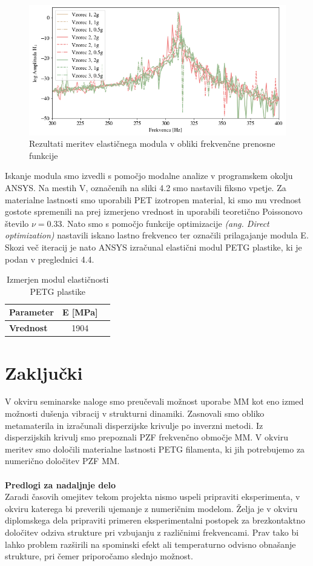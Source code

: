 \documentclass[12pt]{report}
\begin{document}
\begin{figure}[H]
  \centering
  \includegraphics[scale=0.6]{Images/frf.png}
  \caption{Rezultati meritev elastičnega modula v obliki frekvenčne prenosne funkcije}
\end{figure}
\noindent Iskanje modula smo izvedli s pomočjo modalne analize v programskem okolju ANSYS. Na mestih V, označenih na sliki 4.2 smo nastavili fiksno vpetje. Za materialne lastnosti smo uporabili PET izotropen material, ki smo mu
vrednost gostote spremenili na prej izmerjeno vrednost in uporabili teoretično Poissonovo število $\nu=0.33$. Nato smo s pomočjo funkcije optimizacije \emph{(ang. Direct optimization)} nastavili iskano lastno frekvenco ter označili prilagajanje modula E. Skozi več iteracij je nato
ANSYS izračunal elastični modul PETG plastike, ki je podan v preglednici 4.4.
\begin{table}[H]
  \caption{Izmerjen modul elastičnosti PETG plastike}
  \centering
  \begin{tabular}{ | l | c | r | }
    \hline
    \textbf{Parameter} & E [MPa] \\ \hline
    \textbf{Vrednost} & 1904 \\
    \hline  
  \end{tabular}
\end{table}

\chapter{Zaključki}
V okviru seminarske naloge smo preučevali možnost uporabe \ac{MM} kot eno izmed možnosti dušenja vibracij v strukturni dinamiki. 
Zasnovali smo obliko metamaterila in izračunali disperzijske krivulje po inverzni metodi. Iz disperzijskih krivulj smo prepoznali \ac{PZF} frekvenčno
območje \ac{MM}. V okviru meritev smo določili materialne lastnosti PETG filamenta, ki jih potrebujemo za numerično določitev \ac{PZF} \ac{MM}.
\\
\\
\textbf{Predlogi za nadaljnje delo}
\\
Zaradi časovih omejitev tekom projekta nismo uspeli pripraviti eksperimenta, v okviru katerega bi preverili ujemanje z numeričnim modelom. Želja je v okviru diplomskega dela 
pripraviti primeren eksperimentalni postopek za brezkontaktno določitev odziva strukture pri vzbujanju z različnimi frekvencami. Prav tako bi lahko problem razširili na spominski efekt ali temperaturno odvisno obnašanje strukture, pri čemer priporočamo slednjo
možnost.


\printbibliography[heading=bibnumbered]
\end{document}

